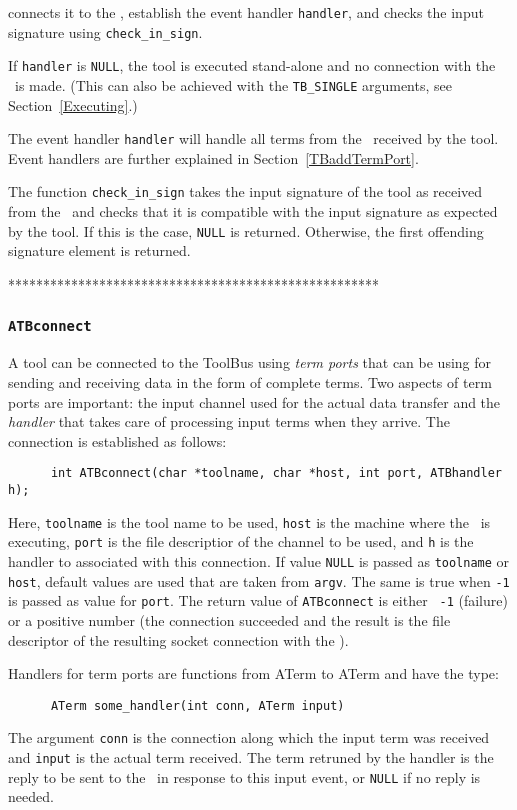 \documentclass[a4,twoside,noweb]{article} %
\begin{document}
connects it to the \TB, establish the event handler {\tt handler},
and checks the input signature using {\tt check\_in\_sign}.

If {\tt handler} is {\tt NULL}, the tool is executed stand-alone
and no connection with the \TB\ is made.
(This can also be achieved with the {\tt TB\_SINGLE} arguments,
see Section~\ref{Executing}.)

The event handler {\tt handler} will handle all terms
from the \TB\  received by the tool. Event handlers are further explained
in Section~\ref{TBaddTermPort}.

The function {\tt check\_in\_sign} takes the input signature of the
tool as received from the \TB\ and checks that it is compatible with
the input signature as expected by the tool.  If this is the case,
{\tt NULL} is returned.  Otherwise, the first offending
signature element is returned.

*****************************************************

\subsubsection{\label{ATBconnect}{\tt ATBconnect}}

A tool can be connected to the ToolBus using {\em term ports} that can be
using for sending and receiving data in the form of complete terms.  Two
aspects of term ports are important: the input channel used for the actual
data transfer and the {\em handler} that takes care of processing input terms
when they arrive. The connection is established as follows:

\begin{verbatim}
      int ATBconnect(char *toolname, char *host, int port, ATBhandler h);
\end{verbatim}

Here, {\tt toolname} is the tool name to be used, {\tt host} is the machine
where the \TB\ is executing, {\tt port} is the file descriptior of the channel
to be used, and {\tt h} is the handler to associated with this connection.  If
value {\tt NULL} is passed as {\tt toolname} or {\tt host}, default values are
used that are taken from {\tt argv}.  The same is true when {\tt -1} is passed
as value for {\tt port}. The return value of {\tt ATBconnect} is either {\tt
  -1} (failure) or a positive number (the connection succeeded and the result
is the file descriptor of the resulting socket connection with the \TB).

Handlers for term ports are functions from ATerm to ATerm and have the
type:
\begin{verbatim}
      ATerm some_handler(int conn, ATerm input)
\end{verbatim}
The argument {\tt conn} is the connection along which the
input term was received and {\tt input} is the actual term received.
The term retruned by the handler is the reply to be sent  to the \TB\ in response
to this input event, or {\tt NULL} if no reply is needed.
\end{document}
